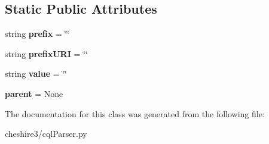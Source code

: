 \subsection*{Static Public Attributes}
\begin{DoxyCompactItemize}
\item 
\hypertarget{classcheshire3_1_1cql_parser_1_1_prefixed_object_aa33e7a3aa3a0846ee6392137f4d12225}{string {\bfseries prefix} = \char`\"{}\char`\"{}}\label{classcheshire3_1_1cql_parser_1_1_prefixed_object_aa33e7a3aa3a0846ee6392137f4d12225}

\item 
\hypertarget{classcheshire3_1_1cql_parser_1_1_prefixed_object_a06e4e3d94f4670e3582f7019901457b2}{string {\bfseries prefix\-U\-R\-I} = \char`\"{}\char`\"{}}\label{classcheshire3_1_1cql_parser_1_1_prefixed_object_a06e4e3d94f4670e3582f7019901457b2}

\item 
\hypertarget{classcheshire3_1_1cql_parser_1_1_prefixed_object_a3fd695cfeddab54f753f8fc93a52a8e6}{string {\bfseries value} = \char`\"{}\char`\"{}}\label{classcheshire3_1_1cql_parser_1_1_prefixed_object_a3fd695cfeddab54f753f8fc93a52a8e6}

\item 
\hypertarget{classcheshire3_1_1cql_parser_1_1_prefixed_object_ae8bb296e2a69afbf1da7f48f0bf35f12}{{\bfseries parent} = None}\label{classcheshire3_1_1cql_parser_1_1_prefixed_object_ae8bb296e2a69afbf1da7f48f0bf35f12}

\end{DoxyCompactItemize}


The documentation for this class was generated from the following file\-:\begin{DoxyCompactItemize}
\item 
cheshire3/cql\-Parser.\-py\end{DoxyCompactItemize}

